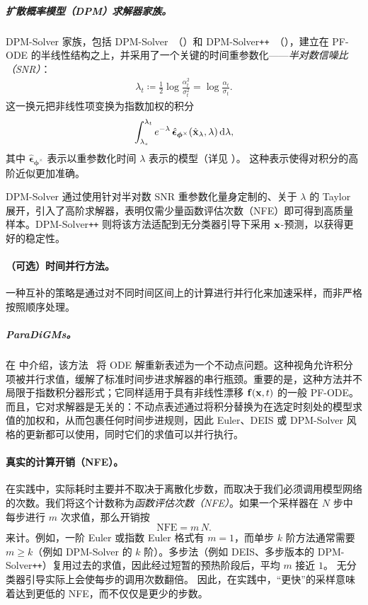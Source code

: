\subparagraph{扩散概率模型（DPM）求解器家族。}
DPM-Solver 家族，包括 DPM-Solver~\citep{lu2022dpm}（）和 DPM-Solver\texttt{++}~\citep{lu2022dpm2}（），建立在 PF-ODE 的半线性结构之上，并采用了一个关键的时间重参数化——\emph{半对数信噪比（SNR）}：
\begin{align*}
    \lambda_t \coloneqq \frac{1}{2}\log \frac{\alpha_t^2}{\sigma_t^2} = \log \frac{\alpha_t}{\sigma_t}.
\end{align*}
这一换元把非线性项变换为指数加权的积分
\[
\int_{\lambda_s}^{\lambda_t} e^{-\lambda}\,\hat{\bm{\epsilon}}_{\bm{\phi}^\times}(\hat{{\mathbf{x}}}_\lambda,\lambda) \mathop{}\!\mathrm{d} \lambda,
\]
其中 $\hat{\bm{\epsilon}}_{\bm{\phi}^\times}$ 表示以重参数化时间 $\lambda$ 表示的模型（详见 ）。
这种表示使得对积分的高阶近似更加准确。

DPM-Solver 通过使用针对半对数 SNR 重参数化量身定制的、关于 $\lambda$ 的 Taylor 展开，引入了高阶求解器，表明仅需少量函数评估次数（NFE）即可得到高质量样本。DPM-Solver\texttt{++} 则将该方法适配到无分类器引导下采用 ${\mathbf{x}}$-预测，以获得更好的稳定性。






\paragraph{（可选）时间并行方法。}
一种互补的策略是通过对不同时间区间上的计算进行并行化来加速采样，而非严格按照顺序处理。

\subparagraph{ParaDiGMs。}
在  中介绍，该方法~\citep{shih2023parallel} 将 ODE 解重新表述为一个不动点问题。这种视角允许积分项被并行求值，缓解了标准时间步进求解器的串行瓶颈。重要的是，这种方法并不局限于指数积分器形式；它同样适用于具有非线性漂移 ${\mathbf{f}}({\mathbf{x}},t)$ 的一般 PF-ODE。而且，它对求解器是无关的：不动点表述通过将积分替换为在选定时刻处的模型求值的加权和，从而包裹任何时间步进规则，因此 Euler、DEIS 或 DPM-Solver 风格的更新都可以使用，同时它们的求值可以并行执行。





\paragraph{真实的计算开销（NFE）。}
在实践中，实际耗时主要并不取决于离散化步数，而取决于我们必须调用模型网络的次数。我们将这个计数称为\emph{函数评估次数（NFE）}。如果一个采样器在 $N$ 步中每步进行 $m$ 次求值，那么开销按
\[
\mathrm{NFE} = m\,N.
\]
来计。例如，一阶 Euler 或指数 Euler 格式有 $m=1$，而单步 $k$ 阶方法通常需要 $m\geq k$（例如 DPM-Solver 的 $k$ 阶）。多步法（例如 DEIS、多步版本的 DPM-Solver\texttt{++}）复用过去的求值，因此经过短暂的预热阶段后，平均 $m$ 接近 $1$。
无分类器引导实际上会使每步的调用次数翻倍。
因此，在实践中，“更快”的采样意味着达到更低的 NFE，而不仅仅是更少的步数。



